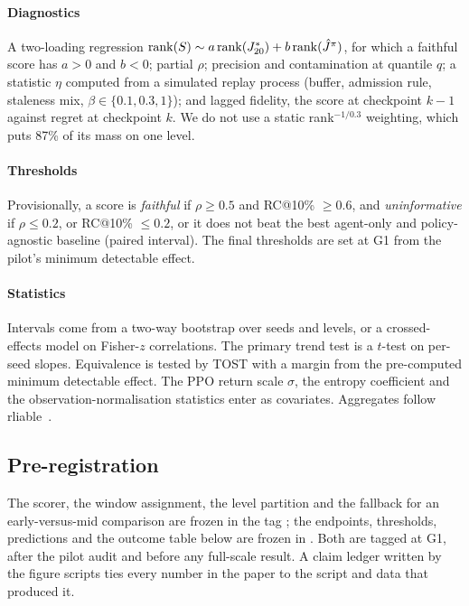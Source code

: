 \paragraph{Diagnostics} A two-loading regression
$\mathrm{rank}(S) \sim a\,\mathrm{rank}(J^{*}_{20}) + b\,\mathrm{rank}(\hat{J}^{\pi})$, for which a
faithful score has $a > 0$ and $b < 0$; partial $\rho$; precision and contamination at
quantile $q$; a statistic $\eta$ computed from a simulated \PLRp{} replay process
(buffer, admission rule, staleness mix, $\beta \in \{0.1, 0.3, 1\}$); and lagged
fidelity, the score at checkpoint $k-1$ against regret at checkpoint $k$. We do not use
a static rank$^{-1/0.3}$ weighting, which puts 87\% of its mass on one level.

\paragraph{Thresholds} Provisionally, a score is \emph{faithful} if $\rho \ge 0.5$ and
RC@10\% $\ge 0.6$, and \emph{uninformative} if $\rho \le 0.2$, or RC@10\% $\le 0.2$, or it
does not beat the best agent-only and policy-agnostic baseline (paired interval). The
final thresholds are set at G1 from the pilot's minimum detectable effect.

\paragraph{Statistics} Intervals come from a two-way bootstrap over seeds and levels, or a
crossed-effects model on Fisher-$z$ correlations. The primary trend test is a $t$-test on
per-seed slopes. Equivalence is tested by TOST with a margin from the pre-computed minimum
detectable effect. The PPO return scale $\sigma$, the entropy coefficient and the
observation-normalisation statistics enter as covariates. Aggregates follow
rliable~\citep{agarwal2021rliable}.

\subsection{Pre-registration}
\label{sec:prereg}

The scorer, the window assignment, the level partition and the fallback for an
early-versus-mid comparison are frozen in the tag ; the endpoints,
thresholds, predictions and the outcome table below are frozen in . Both
are tagged at G1, after the pilot audit and before any full-scale result. A claim ledger
written by the figure scripts ties every number in the paper to the script and data that
produced it.

